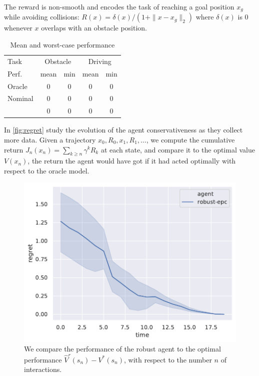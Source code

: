\documentclass{article}
\begin{document}
The reward is non-smooth and encodes the task of reaching a goal position $x_g$ while avoiding collisions: $R(x) = \delta(x)/(1 + \|x - x_g\|_2)$  where $\delta(x)$ is $0$ whenever $x$ overlaps with an obstacle position.

\begin{table}[htbp]
	\caption{Mean and worst-case performance}
	\label{tab:results}
	\centering
	\begin{tabular}{lcccc}
		\toprule
		\multicolumn{1}{l}{Task} &
		\multicolumn{2}{c}{Obstacle}    &
		\multicolumn{2}{c}{Driving}\\
		\cmidrule(lr){2-3}
		\cmidrule(lr){4-5}
		Perf. &
		\multicolumn{1}{c}{mean} &
		\multicolumn{1}{c}{min} &
		\multicolumn{1}{c}{mean} &
		\multicolumn{1}{c}{min}\\
		\midrule
		Oracle & \num{0} & \num{0} & \num{0} & \num{0} \\
		Nominal & \num{0} & \num{0} & \num{0} & \num{0} \\
		\OurAlgorithm & \num{0} & \num{0} & \num{0} & \num{0} \\
		\bottomrule
	\end{tabular}
\end{table}
 
In  \autoref{fig:regret} study the evolution of the agent conservativeness as they collect more data. Given a trajectory $x_0, R_0, x_1, R_1, \dots$, we compute the cumulative return $J_n(x_n) = \sum_{k\geq n} \gamma^k R_k$ at each state, and compare it to the optimal value $V(x_n)$, the return the agent would have got if it had acted optimally with respect to the oracle model.

\begin{figure}[tp]
	\centering
	\includegraphics[width=0.8\linewidth]{img/regret.pdf}
	\caption{We compare the performance of the robust agent to the optimal performance $\hat{V}^r(s_n)-V^*(s_n)$, with respect to the number $n$ of interactions.}
	\label{fig:regret}
\end{figure}
\end{document}
